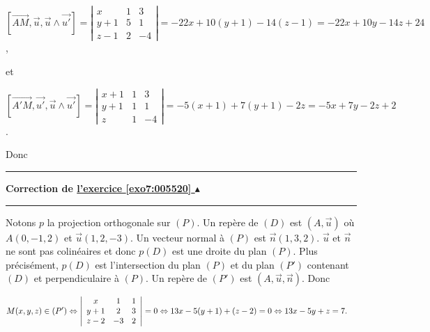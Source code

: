 \documentclass[11pt,a4paper]{article}
\newcounter{exo}
\newcommand{\correction}[1]{\hypertarget{cor7:#1}{}\label{cor7:#1}{\bf Correction de \hyperlink{exo7:#1}{l'exercice \ref{exo7:#1} $\blacktriangle$}}\vspace{1mm}\hrule\vspace{1mm}}
\newcommand{\fincorrection}{\vspace{1mm}\hrule\vspace*{7mm}}
\begin{document}
\begin{center}
$\left[\overrightarrow{AM},\overrightarrow{u},\overrightarrow{u}\wedge\overrightarrow{u'}\right]=\left|
\begin{array}{ccc}
x&1&3\\
y+1&5&1\\
z-1&2&-4
\end{array}
\right|=-22x+10(y+1)-14(z-1)=-22x+10y-14z+24$,
\end{center}
et

\begin{center}
$\left[\overrightarrow{A'M},\overrightarrow{u'},\overrightarrow{u}\wedge\overrightarrow{u'}\right]=\left|
\begin{array}{ccc}
x+1&1&3\\
y+1&1&1\\
z&1&-4
\end{array}
\right|=-5(x+1)+7(y+1)-2z=-5x+7y-2z+2$.
\end{center}
Donc

\begin{center}
\end{center}

\fincorrection
\correction{005520}
Notons $p$ la projection orthogonale sur $(P)$.
Un repère de $(D)$ est $\left(A,\overrightarrow{u}\right)$ où $A(0,-1,2)$ et $\overrightarrow{u}(1,2,-3)$. Un vecteur normal à $(P)$ est $\overrightarrow{n}(1,3,2)$. $\overrightarrow{u}$ et $\overrightarrow{n}$ ne sont pas colinéaires et donc $p(D)$ est une droite du plan $(P)$.
Plus précisément, $p(D)$ est l'intersection du plan $(P)$ et du plan $(P')$ contenant $(D)$ et perpendiculaire à $(P)$. Un repère de $(P')$ est $\left(A,\overrightarrow{u},\overrightarrow{n}\right)$. Donc

\begin{align*}\ensuremath
M(x,y,z)\in(P')&\Leftrightarrow\left|
\begin{array}{ccc}
x&1&1\\
y+1&2&3\\
z-2&-3&2
\end{array}
\right|=0\Leftrightarrow13x-5(y+1)+(z-2)=0\Leftrightarrow13x-5y+z=7.
\end{align*}
\end{document}
